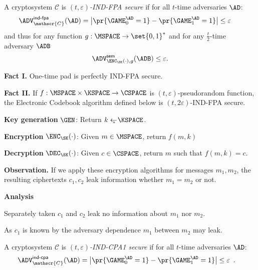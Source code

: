 \documentclass[landscape,footrule]{foils}
\newcommand{\CS}{\mathscr{C}}
\begin{document}


A cryptosystem $\CS$ is \emph{$(t,\varepsilon)$-IND-FPA secure} if for all
$t$-time adversaries $\AD$:
\begin{align*}
  \advINDFPAXX{\CS}{\AD}
   &=\bigl|\pr{\GAME_0^\AD=1}-\pr{\GAME_1^\AD=1}\bigr|\leq \varepsilon\enspace
\end{align*}
and thus for any function $g:\MSPACE\to\set{0,1}^*$ and for any $\frac{t}{2}$-time adversary $\ADB$
\begin{align*}
\advSEMXX{\ENC_\SK(\cdot),g}{\ADB}\leq \varepsilon.  
\end{align*}


\textbf{Fact I.} One-time pad is perfectly IND-FPA secure.

\textbf{Fact II.} If $f:\MSPACE\times\KSPACE\to\CSPACE$ is
$(t,\varepsilon)$-pseudorandom function, the Electronic Codebook
algorithm defined below is $(t,2\varepsilon)$-IND-FPA secure.
\begin{triangles}
  \item \textbf{Key generation} $\GEN$: Return $k\getsu\KSPACE$.
  \item \textbf{Encryption} $\ENC_\SK(\cdot)$: Given $m\in\MSPACE$, return $f(m,k)$
  \item \textbf{Decryption} $\DEC_\SK(\cdot)$: Given $c\in\CSPACE$, return $m$ such that $f(m,k)=c$.
\end{triangles}
\bigskip

\textbf{Observation.} If we apply these encryption algorithms for
messages $m_1,m_2$, the resulting ciphertexts $c_1,c_2$ leak
information whether $m_1=m_2$ or not.
\bigskip

\textbf{Analysis}
\begin{triangles}
  \item Separately taken $c_1$ and $c_2$ leak no information about $m_1$ nor $m_2$.
  \item As $c_1$ is known by the adversary dependence  $m_1$ between $m_2$ may leak. 
\end{triangles}



A cryptosystem $\CS$ is \emph{$(t,\varepsilon)$-IND-CPA1 secure} if for all
$t$-time adversaries $\AD$:
\begin{align*}
  \advINDCPAXX{\CS}{\AD}
   &=\bigl|\pr{\GAME_0^\AD=1}-\pr{\GAME_1^\AD=1}\bigr|\leq \varepsilon\enspace.
\end{align*}
\end{document}
